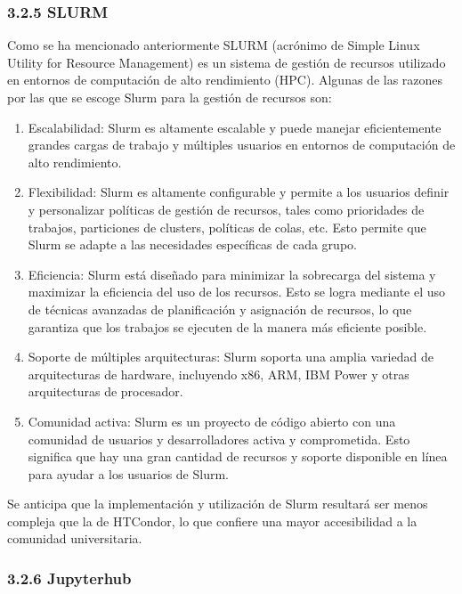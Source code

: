 \begin{spacing}{1.5}
  \subsubsection{3.2.5 SLURM}

  Como se ha mencionado anteriormente SLURM (acrónimo de Simple Linux Utility
  for Resource Management) es un sistema de gestión de recursos utilizado en
  entornos de computación de alto rendimiento (HPC). Algunas de las razones por
  las que se escoge Slurm para la gestión de recursos son:

  \begin{enumerate}
    \item Escalabilidad: Slurm es altamente escalable y puede manejar
          eficientemente grandes cargas de trabajo y múltiples usuarios en entornos de
          computación de alto rendimiento.
    \item Flexibilidad: Slurm es altamente configurable y permite a los
          usuarios definir y personalizar políticas de gestión de recursos, tales como
          prioridades de trabajos, particiones de clusters, políticas de colas, etc. Esto
          permite que Slurm se adapte a las necesidades específicas de cada grupo.
    \item Eficiencia: Slurm está diseñado para minimizar la sobrecarga del
          sistema y maximizar la eficiencia del uso de los recursos. Esto se logra
          mediante el uso de técnicas avanzadas de planificación y asignación de
          recursos, lo que garantiza que los trabajos se ejecuten de la manera más
          eficiente posible.
    \item Soporte de múltiples arquitecturas: Slurm soporta una amplia
          variedad de arquitecturas de hardware, incluyendo x86, ARM, IBM Power y otras
          arquitecturas de procesador.
    \item Comunidad activa: Slurm es un proyecto de código abierto con una
          comunidad de usuarios y desarrolladores activa y comprometida. Esto significa
          que hay una gran cantidad de recursos y soporte disponible en línea para ayudar
          a los usuarios de Slurm.
  \end{enumerate}

  Se anticipa que la implementación y utilización de Slurm resultará ser
  menos compleja que la de HTCondor, lo que confiere una mayor accesibilidad a la
  comunidad universitaria. \cite{RHEL-SLURM-1}

  \subsubsection{3.2.6 Jupyterhub}


\end{spacing}
